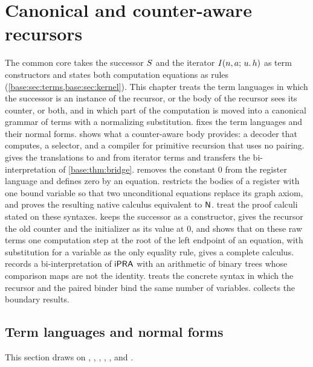 \chapter{Canonical and counter-aware recursors}\label{ctr:chap}
\label{prov:ch:ctr}

The common core takes the successor $S$ and the iterator $I(n,a;\,u.\,h)$ as term
constructors and states both computation equations as rules
(\cref{base:sec:terms,base:sec:kernel}). This chapter treats the term languages in which the
successor is an instance of the recursor, or the body of the recursor sees its counter, or
both, and in which part of the computation is moved into a canonical grammar of terms with a
normalizing substitution.  fixes the term languages and their normal forms.
 shows what a counter-aware body provides: a decoder that computes, a
selector, and a compiler for primitive recursion that uses no pairing. 
gives the translations to and from iterator terms and transfers the bi-interpretation of
\cref{base:thm:bridge}.  removes the constant $0$ from the register
language and defines zero by an equation.  restricts the bodies of a
register with one bound variable so that two unconditional equations replace its graph
axiom, and proves the resulting native calculus equivalent to $\mathsf{N}$.
 treat the
proof calculi stated on these syntaxes.  keeps the successor as a
constructor, gives the recursor the old counter and the initializer as its value at $0$, and
shows that on these raw terms one computation step at the root of the left endpoint of an
equation, with substitution for a variable as the only equality rule, gives a complete
calculus.  records a bi-interpretation of $\mathsf{iPRA}$ with an arithmetic of
binary trees whose comparison maps are not the identity.  treats the concrete syntax in
which the recursor and the paired binder bind the same number of variables.
 collects the boundary results.

\section{Term languages and normal forms}\label{ctr:sec:terms}

This section draws on , ,
, , ,
 and .

